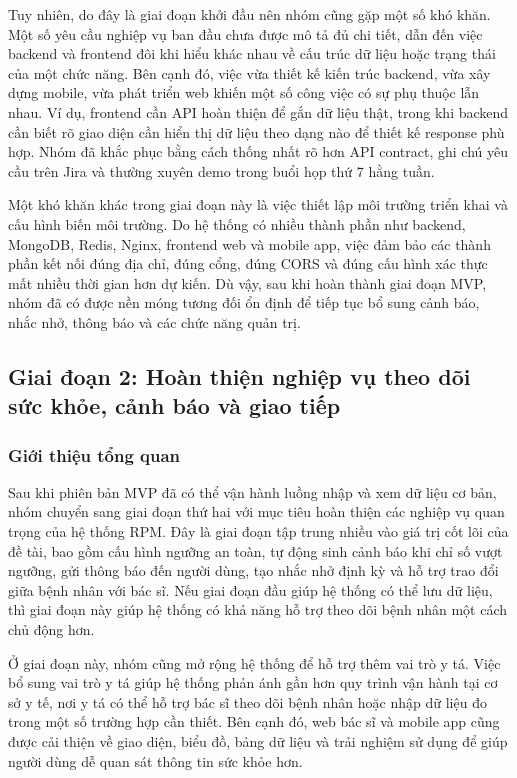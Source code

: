 \par Tuy nhiên, do đây là giai đoạn khởi đầu nên nhóm cũng gặp một số khó khăn. Một số yêu cầu nghiệp vụ ban đầu chưa được mô tả đủ chi tiết, dẫn đến việc backend và frontend đôi khi hiểu khác nhau về cấu trúc dữ liệu hoặc trạng thái của một chức năng. Bên cạnh đó, việc vừa thiết kế kiến trúc backend, vừa xây dựng mobile, vừa phát triển web khiến một số công việc có sự phụ thuộc lẫn nhau. Ví dụ, frontend cần API hoàn thiện để gắn dữ liệu thật, trong khi backend cần biết rõ giao diện cần hiển thị dữ liệu theo dạng nào để thiết kế response phù hợp. Nhóm đã khắc phục bằng cách thống nhất rõ hơn API contract, ghi chú yêu cầu trên Jira và thường xuyên demo trong buổi họp thứ 7 hằng tuần.

\par Một khó khăn khác trong giai đoạn này là việc thiết lập môi trường triển khai và cấu hình biến môi trường. Do hệ thống có nhiều thành phần như backend, MongoDB, Redis, Nginx, frontend web và mobile app, việc đảm bảo các thành phần kết nối đúng địa chỉ, đúng cổng, đúng CORS và đúng cấu hình xác thực mất nhiều thời gian hơn dự kiến. Dù vậy, sau khi hoàn thành giai đoạn MVP, nhóm đã có được nền móng tương đối ổn định để tiếp tục bổ sung cảnh báo, nhắc nhở, thông báo và các chức năng quản trị.

\subsection{Giai đoạn 2: Hoàn thiện nghiệp vụ theo dõi sức khỏe, cảnh báo và giao tiếp}

\subsubsection{Giới thiệu tổng quan}
\par Sau khi phiên bản MVP đã có thể vận hành luồng nhập và xem dữ liệu cơ bản, nhóm chuyển sang giai đoạn thứ hai với mục tiêu hoàn thiện các nghiệp vụ quan trọng của hệ thống RPM. Đây là giai đoạn tập trung nhiều vào giá trị cốt lõi của đề tài, bao gồm cấu hình ngưỡng an toàn, tự động sinh cảnh báo khi chỉ số vượt ngưỡng, gửi thông báo đến người dùng, tạo nhắc nhở định kỳ và hỗ trợ trao đổi giữa bệnh nhân với bác sĩ. Nếu giai đoạn đầu giúp hệ thống có thể lưu dữ liệu, thì giai đoạn này giúp hệ thống có khả năng hỗ trợ theo dõi bệnh nhân một cách chủ động hơn.

\par Ở giai đoạn này, nhóm cũng mở rộng hệ thống để hỗ trợ thêm vai trò y tá. Việc bổ sung vai trò y tá giúp hệ thống phản ánh gần hơn quy trình vận hành tại cơ sở y tế, nơi y tá có thể hỗ trợ bác sĩ theo dõi bệnh nhân hoặc nhập dữ liệu đo trong một số trường hợp cần thiết. Bên cạnh đó, web bác sĩ và mobile app cũng được cải thiện về giao diện, biểu đồ, bảng dữ liệu và trải nghiệm sử dụng để giúp người dùng dễ quan sát thông tin sức khỏe hơn.

